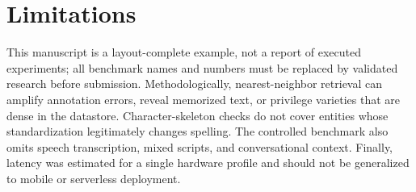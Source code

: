 \section{Limitations}
\label{sec:limitations}

This manuscript is a layout-complete example, not a report of executed
experiments; all benchmark names and numbers must be replaced by validated
research before submission. Methodologically, nearest-neighbor retrieval can
amplify annotation errors, reveal memorized text, or privilege varieties that
are dense in the datastore. Character-skeleton checks do not cover entities
whose standardization legitimately changes spelling. The controlled benchmark
also omits speech transcription, mixed scripts, and conversational context.
Finally, latency was estimated for a single hardware profile and should not be
generalized to mobile or serverless deployment.

